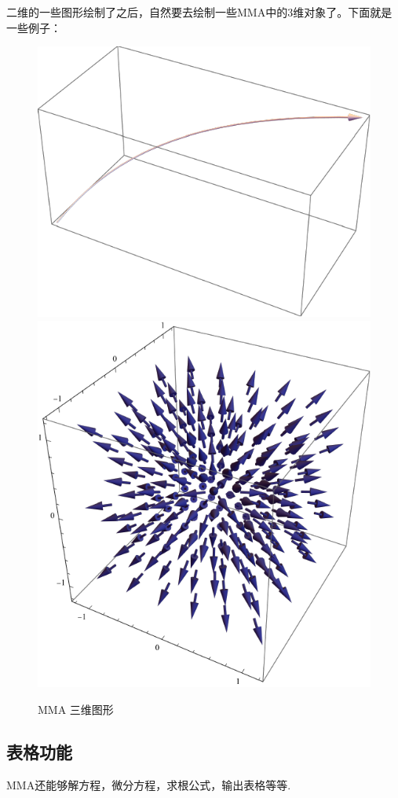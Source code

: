 \documentclass[12pt]{article}
\begin{document}
二维的一些图形绘制了之后，自然要去绘制一些MMA中的3维对象了。下面就是
一些例子：

\begin{figure}[!htb]
    \centering
    \includegraphics[scale=.7]{MMA3d1.pdf}
    \includegraphics[scale=.7]{MMA3d2.pdf}
    \caption{MMA 三维图形}
    \label{MMA 三维图形}
\end{figure}


\subsection{表格功能}
MMA还能够解方程，微分方程，求根公式，输出表格等等.
\end{document}
